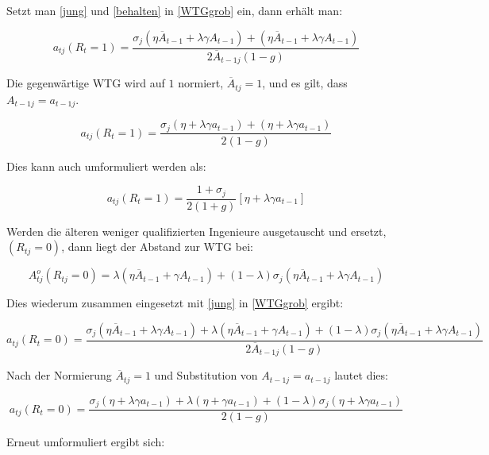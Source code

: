 Setzt man \eqref{jung} und \eqref{behalten} in \eqref{WTGgrob} ein, dann erhält man:


\begin{equation}
a_{tj}(R_{t}=1)=\frac{\sigma_j(\eta\overline{A}_{t-1}+\lambda\gamma A_{t-1})+(\eta\overline{A}_{t-1}+\lambda\gamma A_{t-1})}{2\overline{A}_{t-1j}(1-g)}
\end{equation}


Die gegenwärtige WTG wird auf $1$ normiert, $\overline{A}_{tj}=1$, und es gilt, dass $A_{t-1j}=a_{t-1j}$.


\begin{equation}
a_{tj}(R_{t}=1)=\frac{\sigma_j(\eta+\lambda\gamma a_{t-1})+(\eta + \lambda\gamma a_{t-1})}{2(1-g)}
\end{equation}  


Dies kann auch umformuliert werden als:


\begin{equation}
\boxed{a_{tj}(R_{t}=1)=\frac{1+\sigma_j}{2(1+g)}[\eta+\lambda \gamma a_{t-1}]}
\end{equation}


Werden die älteren weniger qualifizierten Ingenieure ausgetauscht und ersetzt, $(R_{tj}=0)$, dann liegt der Abstand zur WTG bei: 


\begin{equation}
A_{tj}^o(R_{tj}=0)=\lambda(\eta\overline{A}_{t-1}+\gamma A_{t-1})+(1-\lambda)\sigma_j(\eta\overline{A}_{t-1}+\lambda\gamma A_{t-1})\label{austausch}
\end{equation}


Dies wiederum zusammen eingesetzt mit \eqref{jung} in \eqref{WTGgrob} ergibt:


\begin{equation}
a_{tj}(R_{t}=0)=\frac{\sigma_j(\eta\overline{A}_{t-1}+\lambda\gamma A_{t-1})+\lambda(\eta\overline{A}_{t-1}+\gamma A_{t-1})+(1-\lambda)\sigma_j(\eta\overline{A}_{t-1}+\lambda\gamma A_{t-1})}{2\overline{A}_{t-1j}(1-g)}
\end{equation}


Nach der Normierung $\overline{A}_{tj}=1$ und Substitution von $A_{t-1j}=a_{t-1j}$ lautet dies:


\begin{equation}
a_{tj}(R_{t}=0)=\frac{\sigma_j(\eta+\lambda\gamma a_{t-1})+\lambda(\eta+\gamma a_{t-1})+(1-\lambda)\sigma_j(\eta+\lambda\gamma a_{t-1})}{2(1-g)}
\end{equation}


Erneut umformuliert ergibt sich: 



